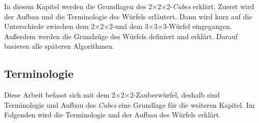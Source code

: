 \documentclass[12pt,a4paper, usenames, dvipsnames]{article}
\theoremstyle{mystyle}
\theoremstyle{definition}
\newcommand{\Ttwo}{2$\times$2$\times$2-}
\newcommand{\Tthree}{3$\times$3$\times$3-}
\begin{document}
In diesem Kapitel werden die Grundlagen des \Ttwo \textit{Cubes} erklärt. Zuerst wird der Aufbau und die Terminologie des Würfels erläutert. Dann wird kurz auf die Unterschiede zwischen dem \Ttwo und dem \Tthree Würfel eingegangen. 
Außerdem werden die Grundzüge des Würfels definiert und erklärt. Darauf basieren alle späteren Algorithmen. 


%
%
%
%
%
%
%
%
%
%
\subsection*{Terminologie} 

Diese Arbeit befasst sich mit dem \Ttwo Zauberwürfel, deshalb sind Terminologie und Aufbau des \textit{Cubes} eine Grundlage für die weiteren Kapitel.
Im Folgenden wird die Terminologie und der Aufbau des Würfels erklärt.
\end{document}
